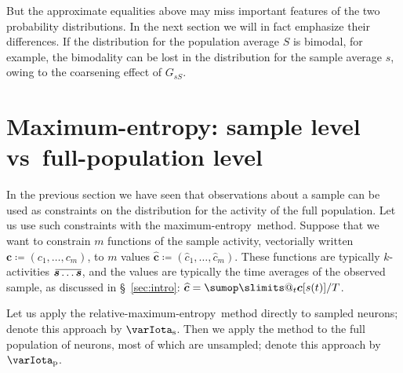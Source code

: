 \documentclass[\ifafour a4paper,12pt,\else a5paper,10pt,\fi%
onecolumn,oneside,article,%
british%
]{memoir}
\makeatletter
\theoremstyle{remark}
\theoremstyle{innote}
\def\sum{\DOTSI\sumop\slimits@}
\newcommand*{\citep}{\parencites}
\newcommand*{\defd}{\coloneqq}
\newcommand*{\pf}{\mathrm{p}}%
\renewcommand*{\|}{\nonscript\,\vert\nonscript\;\mathopen{}}
\newcommand*{\sect}{\S}%
\newcommand*{\vs}{{vs}}
\newcommand*{\widebar}[1]{{\mkern1.5mu\skew{2}\overline{\mkern-1.5mu#1\mkern-1.5mu}\mkern 1.5mu}}
\newcommand*{\sav}{\widebar} %
\newcommand*{\ypp}{G}
\newcommand*{\yRv}{S}
\newcommand*{\yrv}{s}
\newcommand*{\yNv}{N}
\newcommand*{\yr}{\bm{\yrv}}%
\newcommand*{\yrs}{\yrv}%
\newcommand*{\yRf}{\yRv}%
\newcommand*{\yHa}{\varIota_\textrm{p}}
\newcommand*{\yHb}{\varIota_\textrm{s}}
\newcommand*{\yg}{\bm{c}}
\newcommand*{\yc}{\widehat{\bm{c}}}
\newcommand*{\me}{maximum-entropy}
\makeatother
\begin{document}
But the approximate equalities above may miss important features of the two
probability distributions. In the next section we will in fact emphasize
their differences. If the distribution for the population average $\yRf$ is
bimodal, for example, the bimodality can be lost in the distribution for
the sample average $\yrs$, owing to the coarsening effect of
$\ypp_{\yrs\yRf}$.




\section{Maximum-entropy: sample level \vs\ full-population level}
\label{sec:specific_initial_probability}

In the previous section we have seen that observations about a sample can
be used as constraints on the distribution for the activity of the full
population. Let us use such constraints with the \me\ method. Suppose that
we want to constrain $m$ functions of the sample activity, vectorially
written $\yg \defd (c_1,\dotsc,c_m)$, to $m$ values
$\yc \defd (\widehat{c}_1,\dotsc,\widehat{c}_m)$. These functions are typically $k$-activities
$\sav{\yr\dotso \yr}$, and the values are typically the time averages of
the observed sample, as discussed in \sect~\ref{sec:intro}:
$\yc = \sum_t \yg[\yrs(t)]/T$.

Let us apply the relative-\me\ method \citep{sivia1996_r2006,meadetal1984}
directly to sampled neurons; denote this approach by $\yHb$. Then we apply
the method to the full population of neurons, most of which are unsampled;
denote this approach by $\yHa$.
\end{document}
